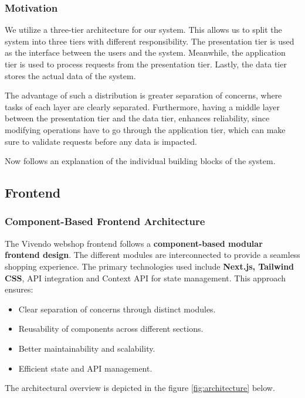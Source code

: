 \subsubsection{Motivation}
We utilize a three-tier architecture for our system.
This allows us to split the system into three tiers with different responsibility.
The presentation tier is used as the interface between the users and the system.
Meanwhile, the application tier is used to process requests from the presentation tier.
Lastly, the data tier stores the actual data of the system.

The advantage of such a distribution is greater separation of concerns,
where tasks of each layer are clearly separated.
Furthermore, having a middle layer between the presentation tier and the data tier,
enhances reliability, since modifying operations have to go through the
application tier, which can make sure to validate requests before any data is impacted.


Now follows an explanation of the individual building blocks of the system.
\subsection{Frontend}
\subsubsection{Component-Based Frontend Architecture}
The Vivendo webshop frontend follows a \textbf{component-based modular frontend design}. The different modules are interconnected to provide a seamless shopping experience. The primary technologies used include \textbf{Next.js, Tailwind CSS}, API integration and Context API for state management. This approach ensures:
\begin{itemize}
    \item Clear separation of concerns through distinct modules.
    \item Reusability of components across different sections.
    \item Better maintainability and scalability.
    \item Efficient state and API management.
\end{itemize}
The architectural overview is depicted in the figure \ref{fig:architecture} below.

